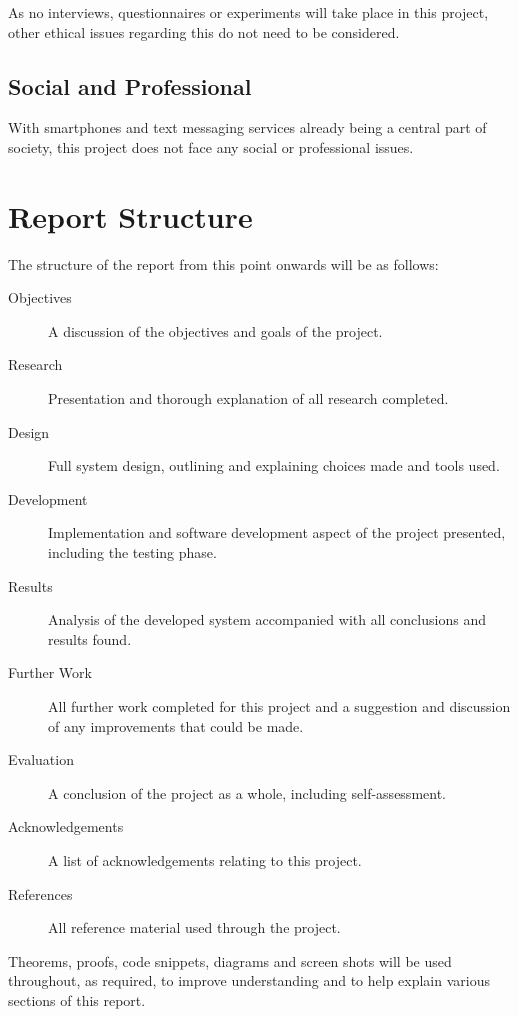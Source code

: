 \documentclass[a4paper,12pt]{report}
\begin{document}
As no interviews, questionnaires or experiments will take place in this project, other ethical issues regarding this do not need to be considered. 

\subsection{Social and Professional}

With smartphones and text messaging services already being a central part of society, this project does not face any social or professional issues. %

\section{Report Structure}

The structure of the report from this point onwards will be as follows:

\begin{description}
  \item[Objectives] A discussion of the objectives and goals of the project.
  \item[Research] Presentation and thorough explanation of all research completed.
  \item[Design] Full system design, outlining and explaining choices made and tools used. 
  \item[Development] Implementation and software development aspect of the project presented, including the testing phase.
  \item[Results] Analysis of the developed system accompanied with all conclusions and results found. 
  \item[Further Work] All further work completed for this project and a suggestion and discussion of any improvements that could be made.
  \item[Evaluation] A conclusion of the project as a whole, including self-assessment.
  \item[Acknowledgements] A list of acknowledgements relating to this project.
  \item[References] All reference material used through the project.
\end{description}

Theorems, proofs, code snippets, diagrams and screen shots will be used throughout, as required, to improve understanding and to help explain various sections of this report. 
\end{document}
